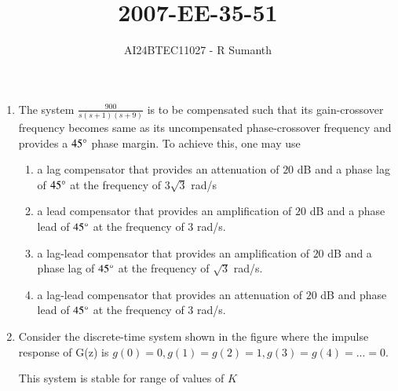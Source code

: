 \documentclass[journal,12pt,onecolumn]{IEEEtran}
\theoremstyle{remark}
\begin{document}

\vspace{3cm}

\title{\textbf{2007-EE-35-51}}
\author{AI24BTEC11027 - R Sumanth}
\maketitle
\bigskip

\renewcommand{\thefigure}{\theenumi}
\renewcommand{\thetable}{\theenumi}
\setlength{\columnsep}{2.5em}
\begin{enumerate}
    

\item The system $\frac{900}{s(s+1)(s+9)}$ is to be compensated such that its gain-crossover frequency becomes same as its uncompensated phase-crossover frequency and provides a $45 \degree$ phase margin. To achieve this, one may use 
\begin{enumerate}
    \item a lag compensator that provides an attenuation of $20$ dB and a phase lag of $45\degree$ at the frequency of $3\sqrt{3}$ rad/s
    \item a lead compensator that provides an amplification of $20$ dB and a phase lead of $45 \degree$ at the frequency of $3$ rad/s.
    \item a lag-lead compensator that provides an amplification of $20$ dB and a phase lag of $45 \degree$ at the frequency of $\sqrt{3}$ rad/s.
    \item a lag-lead compensator that provides an attenuation of $20$ dB and phase lead of $45 \degree$ at the frequency of $3$ rad/s.\\
\end{enumerate} 

\item Consider the discrete-time system shown in the figure where the impulse response of G(z) is $g(0)=0, g(1)=g(2)=1, g(3)=g(4)=...=0.$ \\


 This system is stable for range of values of $K$ 
 

\end{enumerate}
\end{document}
